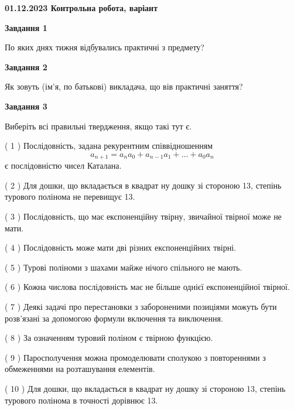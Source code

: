 \documentclass[12pt, ukrainian]{article}
\begin{document}
\begin {large}

\textbf{01.12.2023 Контрольна робота, варіант  }\par


{
{\begin {center}\textbf{Завдання 1}\end {center}}\par
По яких днях тижня відбувались практичні з предмету?\par
{\begin {center}\textbf{Завдання 2}\end {center}}\par
Як зовуть (ім'я, по батькові) викладача, що вів практичні заняття?\par
{\begin {center}\textbf{Завдання 3}\end {center}}\par
Виберіть всі правильні твердження, якщо такі тут є.\par
\vspace{2mm}
( 1 ) Послідовність, задана рекурентним співвідношенням $$a_{n+1}=a_{n}a_{0}+a_{n-1}a_{1}+\ldots+a_0a_{n}$$ є послідовністю чисел Каталана.%

( 2 ) Для дошки, що вкладається в квадрат ну дошку зі стороною 13, степінь турового полінома не перевищує 13.%

( 3 ) Послідовність, що має експоненційну твірну, звичайної твірної може не мати.%

( 4 ) Послідовність може мати дві різних експоненційних твірні.%

( 5 ) Турові поліноми з шахами майже нічого спільного не мають.%

( 6 ) Кожна числова послідовність має не більше однієї  експоненційної твірної.%

( 7 ) Деякі задачі про перестановки з забороненими позиціями можуть бути розв’я\-за\-ні за допомогою формули включення та виключення.%

( 8 ) За означенням туровий поліном є твірною функцією.%

( 9 ) Паросполучення можна промоделювати сполукою з повтореннями з обмеженнями на розташування елементів.%

( 10 ) Для дошки, що вкладається в квадрат ну дошку зі стороною 13, степінь турового полінома в точності дорівнює 13.%
}
\end {large}

\vspace{4mm}
\newpage
\end{document}
